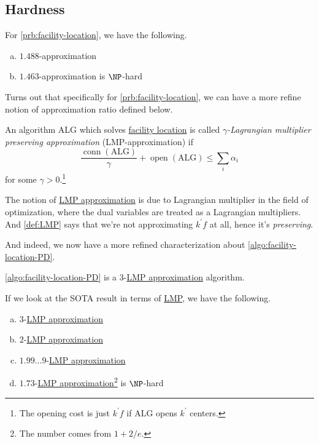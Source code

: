 \subsection{Hardness}
For \autoref{prb:facility-location}, we have the following.
\begin{enumerate}[(a)]
	\item \(1.488\)-approximation~\cite{LI201345}
	\item \(1.463\)-approximation is \(\NP\)-hard~\cite{GUHA1999228}
\end{enumerate}

Turns out that specifically for \autoref{prb:facility-location}, we can have a more refine notion of approximation ratio defined below.

\begin{definition}\label{def:LMP}
	An algorithm \(\mathrm{ALG}\) which solves \hyperref[prb:facility-location]{facility location} is called \emph{\(\gamma \)-Lagrangian multiplier preserving approximation} (LMP-approximation) if
	\[
		\frac{\mathop{\mathrm{conn}}(\mathrm{ALG})}{\gamma }+ \mathop{\mathrm{open}}(\mathrm{ALG}) \leq \sum_{i} \alpha _i
	\]
	for some \(\gamma > 0\).\footnote{The opening cost is just \(k^\prime f\) if \(\mathrm{ALG}\) opens \(k^\prime \) centers.}
\end{definition}
\begin{remark}
	The notion of \hyperref[def:LMP]{LMP approximation} is due to Lagrangian multiplier in the field of optimization, where the dual variables  are treated as a Lagrangian multipliers. And \autoref{def:LMP} says that we're not approximating \(k^\prime f\) at all, hence it's \emph{preserving}.
\end{remark}

And indeed, we now have a more refined characterization about \autoref{algo:facility-location-PD}.

\begin{corollary}
	\autoref{algo:facility-location-PD} is a \(3\)-\hyperref[def:LMP]{LMP approximation} algorithm.
\end{corollary}

\begin{remark}[SOTA]
	If we look at the SOTA result in terms of \hyperref[def:LMP]{LMP}, we have the following.
	\begin{enumerate}[(a)]
		\item \(3\)-\hyperref[def:LMP]{LMP approximation}~\cite{10.1145/375827.375845}
		\item \(2\)-\hyperref[def:LMP]{LMP approximation}~\cite{10.1145/509907.510012}
		\item \(1.99\ldots 9 \)-\hyperref[def:LMP]{LMP approximation}~\cite{https://doi.org/10.48550/arxiv.2207.05150}
		\item \(1.73\)-\hyperref[def:LMP]{LMP approximation}\footnote{The number comes from \(1 + 2 / e\).} is \(\NP\)-hard~\cite{10.1145/509907.510012}
	\end{enumerate}
\end{remark}

